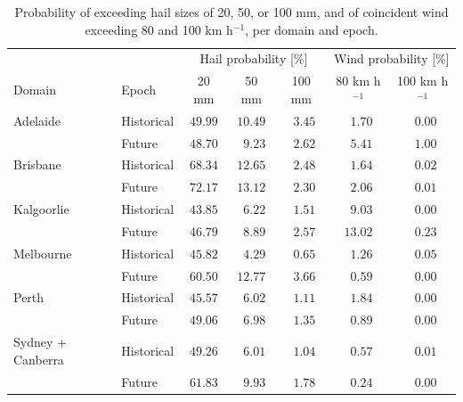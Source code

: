 \documentclass[]{agujournal2019}\usepackage[]{graphicx}\usepackage[]{xcolor}
\begin{document}
\begin{table}
      \centering
      \caption{Probability of exceeding hail sizes of 20, 50, or 100 mm, and of coincident wind exceeding 80 and 100 km h$^{-1}$, per domain and epoch.}
      \begin{tabular}{llccccc}
      \hline
      & & \multicolumn{3}{c}{Hail probability [\%]} & \multicolumn{2}{c}{Wind probability [\%]} \\ 
      Domain & Epoch & 20 mm & 50 mm & 100 mm & 80 km h$^{-1}$ & \multicolumn{1}{c}{100 km h$^{-1}$} \\ 
      \hline
      Adelaide & Historical  & $49.99$ & $10.49$ & $\phantom{0}3.45$ & $\phantom{0}1.70$ & $\phantom{0}0.00$ \\
      & Future  & $48.70$ & $\phantom{0}9.23$ & $\phantom{0}2.62$ & $\phantom{0}5.41$ & $\phantom{0}1.00$ \\
     Brisbane & Historical  & $68.34$ & $12.65$ & $\phantom{0}2.48$ & $\phantom{0}1.64$ & $\phantom{0}0.02$ \\
      & Future  & $72.17$ & $13.12$ & $\phantom{0}2.30$ & $\phantom{0}2.06$ & $\phantom{0}0.01$ \\
     Kalgoorlie & Historical  & $43.85$ & $\phantom{0}6.22$ & $\phantom{0}1.51$ & $\phantom{0}9.03$ & $\phantom{0}0.00$ \\
      & Future  & $46.79$ & $\phantom{0}8.89$ & $\phantom{0}2.57$ & $13.02$ & $\phantom{0}0.23$ \\
     Melbourne & Historical  & $45.82$ & $\phantom{0}4.29$ & $\phantom{0}0.65$ & $\phantom{0}1.26$ & $\phantom{0}0.05$ \\
      & Future  & $60.50$ & $12.77$ & $\phantom{0}3.66$ & $\phantom{0}0.59$ & $\phantom{0}0.00$ \\
     Perth & Historical  & $45.57$ & $\phantom{0}6.02$ & $\phantom{0}1.11$ & $\phantom{0}1.84$ & $\phantom{0}0.00$ \\
      & Future  & $49.06$ & $\phantom{0}6.98$ & $\phantom{0}1.35$ & $\phantom{0}0.89$ & $\phantom{0}0.00$ \\
     Sydney + Canberra & Historical  & $49.26$ & $\phantom{0}6.01$ & $\phantom{0}1.04$ & $\phantom{0}0.57$ & $\phantom{0}0.01$ \\
      & Future  & $61.83$ & $\phantom{0}9.93$ & $\phantom{0}1.78$ & $\phantom{0}0.24$ & $\phantom{0}0.00$ \\
      \hline 
      \end{tabular}
\end{table}
\end{document}
